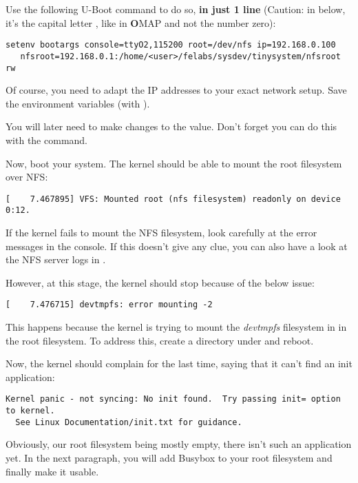 Use the following U-Boot command to do so, {\bf in just 1 line}
(Caution: in  below, it's the capital letter , like in
{\bf O}MAP and not the number zero):

\begin{verbatim}
setenv bootargs console=ttyO2,115200 root=/dev/nfs ip=192.168.0.100
   nfsroot=192.168.0.1:/home/<user>/felabs/sysdev/tinysystem/nfsroot rw
\end{verbatim}

Of course, you need to adapt the IP addresses to your exact network
setup. Save the environment variables (with ).

You will later need to make changes to the  value.
Don't forget you can do this with the  command.

Now, boot your system. The kernel should be able to mount the root
filesystem over NFS:

\begin{verbatim}
[    7.467895] VFS: Mounted root (nfs filesystem) readonly on device 0:12.
\end{verbatim}

If the kernel fails to mount the NFS filesystem, look carefully at the
error messages in the console. If this doesn't give any clue, you can
also have a look at the NFS server logs in .

However, at this stage, the kernel should stop because of the below
issue:

\begin{verbatim}
[    7.476715] devtmpfs: error mounting -2
\end{verbatim}

This happens because the kernel is trying to mount the {\em devtmpfs}
filesystem in  in the root filesystem. To address this,
create a  directory under  and reboot.

Now, the kernel should complain for the last time, saying that it can't
find an init application:

\footnotesize
\begin{verbatim}
Kernel panic - not syncing: No init found.  Try passing init= option to kernel.
  See Linux Documentation/init.txt for guidance.
\end{verbatim}
\normalsize

Obviously, our root filesystem being mostly empty, there isn't such an
application yet. In the next paragraph, you will add Busybox to your root
filesystem and finally make it usable.

